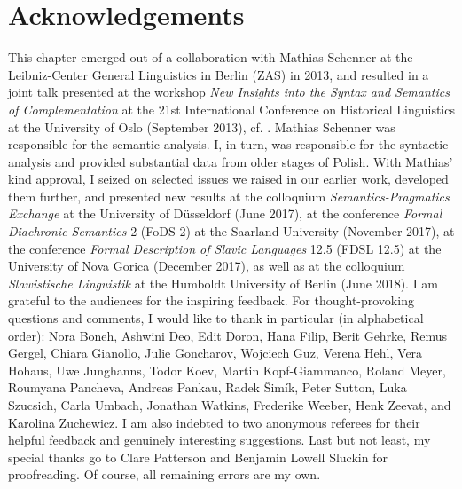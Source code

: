 \documentclass[output=paper
,modfonts
,nonflat]{langsci/langscibook}
\begin{document}
\section*{Acknowledgements} This chapter emerged out of a collaboration with Mathias Schenner at the Leibniz-Center General Linguistics in Berlin (ZAS) in 2013, and resulted in a joint talk presented at the workshop \emph{New Insights into the Syntax and Semantics of Complementation} at the 21st International Conference on Historical Linguistics at the University of Oslo (September 2013), cf. \textcite{JedrzejowskiSchenner-2013}. Mathias Schenner was responsible for the semantic analysis. I, in turn, was responsible for the syntactic analysis and provided substantial data from older stages of Polish. With Mathias'  kind approval, I seized on selected issues we raised in our earlier work, developed them further, and presented new results at the colloquium \emph{Semantics-Pragmatics Exchange} at the University of Düsseldorf (June 2017), at the conference \emph{Formal Diachronic Semantics} 2 (FoDS 2) at the Saarland University (November 2017), at the conference \emph{Formal Description of Slavic Languages} 12.5 (FDSL 12.5) at the University of Nova Gorica (December 2017), as well as at the colloquium \emph{Slawistische Linguistik} at the Humboldt University of Berlin (June 2018). I am grateful to the audiences for the inspiring feedback. For thought-provoking questions and comments, I would like to thank in particular (in alphabetical order): Nora Boneh, Ashwini Deo, Edit Doron, Hana Filip, Berit Gehrke, Remus Gergel, Chiara Gianollo, Julie Goncharov, Wojciech Guz, Verena Hehl, Vera Hohaus, Uwe Junghanns, Todor Koev, Martin Kopf-Giammanco, Roland Meyer, Roumyana Pancheva, Andreas Pankau, Radek Šimík, Peter Sutton, Luka Szucsich, Carla Umbach, Jonathan Watkins, Frederike Weeber, Henk Zeevat, and Karolina Zuchewicz. I am also indebted to two anonymous referees for their helpful feedback and genuinely interesting suggestions. Last but not least, my special thanks go to Clare Patterson and Benjamin Lowell Sluckin for proofreading. Of course, all remaining errors are my own.         
   

{\sloppy\printbibliography[heading=subbibliography,notkeyword=this]}
\end{document}
